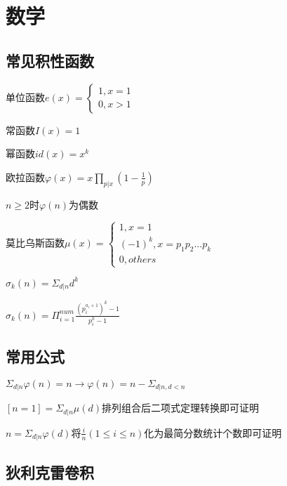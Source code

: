 \documentclass[UTF8]{ctexart}
\begin{document}
\section{数学}

\subsection{常见积性函数}

单位函数$e(x)= \begin{cases}
	1,x=1 \\ 0,x>1
\end{cases}$\par

常函数$I(x)=1$\par

幂函数$id(x)=x^k$\par

欧拉函数$\varphi(x)=x\prod_{p|x}(1-\frac{1}{p})$\par

$n\geq 2$时$\varphi(n)$为偶数\par

莫比乌斯函数$\mu(x)=\begin{cases}
	1,x=1\\(-1)^k,x=p_1p_2...p_k \\ 0,others
\end{cases}$\par

$\sigma_k(n) = \Sigma_{d|n}d^k$\par

$\sigma_k(n)=\Pi_{i=1}^{num}\frac{(p_i^{a_i+1})^k-1}{p_i^k-1}$\par

\subsection{常用公式}

$\Sigma_{d|n} \varphi (n)=n\rightarrow \varphi(n)=n-\Sigma_{d|n,d<n}$\par

$[n=1]=\Sigma_{d|n}\mu(d)$排列组合后二项式定理转换即可证明\par

$n=\Sigma_{d|n}\varphi(d)$将$\frac{i}{n}(1\leq i\leq n)$化为最简分数统计个数即可证明\par

\subsection{狄利克雷卷积}
\end{document}
